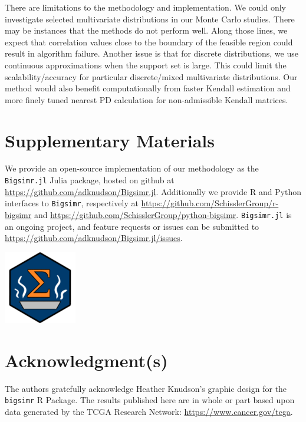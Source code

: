 \documentclass[
]{jss}
\begin{document}
There are limitations to the methodology and implementation. We could
only investigate selected multivariate distributions in our Monte Carlo
studies. There may be instances that the methods do not perform well.
Along those lines, we expect that correlation values close to the
boundary of the feasible region could result in algorithm failure.
Another issue is that for discrete distributions, we use continuous
approximations when the support set is large. This could limit the
scalability/accuracy for particular discrete/mixed multivariate
distributions. Our method would also benefit computationally from faster
Kendall estimation and more finely tuned nearest PD calculation for
non-admissible Kendall matrices.

\newpage

\hypertarget{misc}{%
\section*{Supplementary Materials}\label{misc}}

We provide an open-source implementation of our methodology as the
\texttt{Bigsimr.jl} Julia package, hosted on github at
\url{https://github.com/adknudson/Bigsimr.jl}. Additionally we provide R
and Python interfaces to \texttt{Bigsimr}, respectively at
\url{https://github.com/SchisslerGroup/r-bigsimr} and
\url{https://github.com/SchisslerGroup/python-bigsimr}.
\texttt{Bigsimr.jl} is an ongoing project, and feature requests or
issues can be submitted to
\url{https://github.com/adknudson/Bigsimr.jl/issues}.

\begin{CodeChunk}


\begin{center}\includegraphics[width=0.05\linewidth]{images/hex-bigsimr} \end{center}

\end{CodeChunk}

\hypertarget{acknowledgments}{%
\section*{Acknowledgment(s)}\label{acknowledgments}}

The authors gratefully acknowledge Heather Knudson's graphic design for
the \texttt{bigsimr} R Package. The results published here are in whole
or part based upon data generated by the TCGA Research Network:
\url{https://www.cancer.gov/tcga}.
\end{document}
